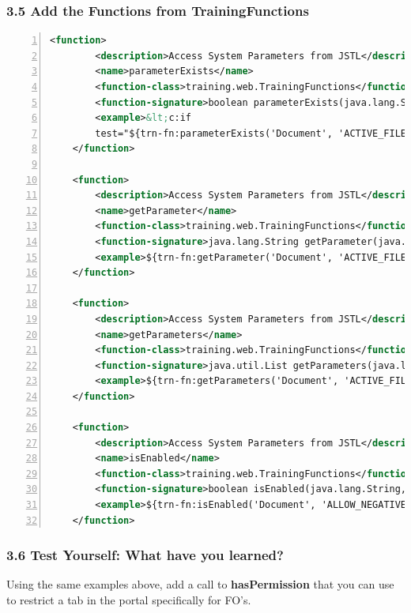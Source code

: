 \subsubsection*{3.5 Add the Functions from TrainingFunctions}
\begin{lstlisting}[basicstyle=\scriptsize,numbers=left,language=xml,backgroundcolor=\color{ubergray},caption={src/main/webapp/WEB-INF/tlds/trnfunc.tld
  Tag Library Definition},frame=single,breaklines=true]
    <function>
        <description>Access System Parameters from JSTL</description>
        <name>parameterExists</name>
        <function-class>training.web.TrainingFunctions</function-class>
        <function-signature>boolean parameterExists(java.lang.String, java.lang.String)</function-signature>
        <example>&lt;c:if
        test="${trn-fn:parameterExists('Document', 'ACTIVE_FILE_TYPES')}"&gt;&lt;/c:if&gt;</example>
    </function>

    <function>
        <description>Access System Parameters from JSTL</description>
        <name>getParameter</name>
        <function-class>training.web.TrainingFunctions</function-class>
        <function-signature>java.lang.String getParameter(java.lang.String, java.lang.String)</function-signature>
        <example>${trn-fn:getParameter('Document', 'ACTIVE_FILE_TYPES')}</example>
    </function>

    <function>
        <description>Access System Parameters from JSTL</description>
        <name>getParameters</name>
        <function-class>training.web.TrainingFunctions</function-class>
        <function-signature>java.util.List getParameters(java.lang.String, java.lang.String)</function-signature>
        <example>${trn-fn:getParameters('Document', 'ACTIVE_FILE_TYPES')}</example>
    </function>

    <function>
        <description>Access System Parameters from JSTL</description>
        <name>isEnabled</name>
        <function-class>training.web.TrainingFunctions</function-class>
        <function-signature>boolean isEnabled(java.lang.String, java.lang.String)</function-signature>
        <example>${trn-fn:isEnabled('Document', 'ALLOW_NEGATIVE_BALANCE_IND')}</example>
    </function>
\end{lstlisting}

\subsubsection*{3.6 Test Yourself: What have you learned?}
Using the same examples above, add a call to \textbf{hasPermission} that
you can use to restrict a tab in the portal specifically for FO's.

